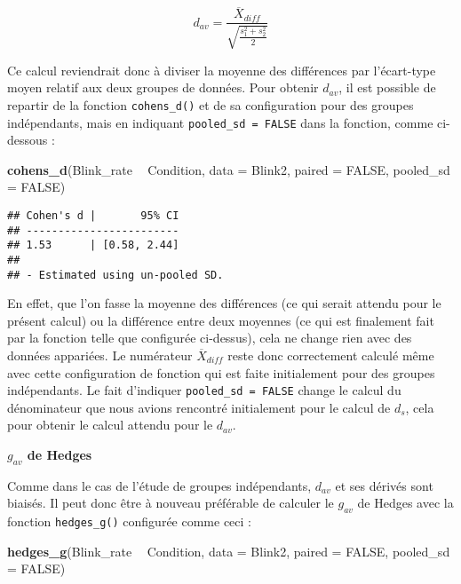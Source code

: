 \documentclass[
  french,
]{book}
\newenvironment{Shaded}{\begin{snugshade}}{\end{snugshade}}
\newcommand{\DataTypeTok}[1]{\textcolor[rgb]{0.13,0.29,0.53}{#1}}
\newcommand{\KeywordTok}[1]{\textcolor[rgb]{0.13,0.29,0.53}{\textbf{#1}}}
\newcommand{\NormalTok}[1]{#1}
\newcommand{\OperatorTok}[1]{\textcolor[rgb]{0.81,0.36,0.00}{\textbf{#1}}}
\newcommand{\OtherTok}[1]{\textcolor[rgb]{0.56,0.35,0.01}{#1}}
\newcommand{\StringTok}[1]{\textcolor[rgb]{0.31,0.60,0.02}{#1}}
\begin{document}
\[d_{av} = \frac{\overline{X} _{diff}}{\sqrt{\frac{s_{1}^2 + s_{2}^2} {2}}}\]

Ce calcul reviendrait donc à diviser la moyenne des différences par l'écart-type moyen relatif aux deux groupes de données. Pour obtenir \(d_{av}\), il est possible de repartir de la fonction \texttt{cohens\_d()} et de sa configuration pour des groupes indépendants, mais en indiquant \texttt{pooled\_sd\ =\ FALSE} dans la fonction, comme ci-dessous :

\begin{Shaded}
\begin{Highlighting}[]
\KeywordTok{cohens_d}\NormalTok{(Blink_rate }\OperatorTok{~}\StringTok{ }\NormalTok{Condition, }
         \DataTypeTok{data =}\NormalTok{ Blink2, }
         \DataTypeTok{paired =} \OtherTok{FALSE}\NormalTok{, }
         \DataTypeTok{pooled_sd =} \OtherTok{FALSE}\NormalTok{)}
\end{Highlighting}
\end{Shaded}

\begin{verbatim}
## Cohen's d |       95% CI
## ------------------------
## 1.53      | [0.58, 2.44]
## 
## - Estimated using un-pooled SD.
\end{verbatim}

En effet, que l'on fasse la moyenne des différences (ce qui serait attendu pour le présent calcul) ou la différence entre deux moyennes (ce qui est finalement fait par la fonction telle que configurée ci-dessus), cela ne change rien avec des données appariées. Le numérateur \(\overline{X} _{diff}\) reste donc correctement calculé même avec cette configuration de fonction qui est faite initialement pour des groupes indépendants. Le fait d'indiquer \texttt{pooled\_sd\ =\ FALSE} change le calcul du dénominateur que nous avions rencontré initialement pour le calcul de \(d_{s}\), cela pour obtenir le calcul attendu pour le \(d_{av}\).

\textbf{\(g_{av}\) de Hedges}

Comme dans le cas de l'étude de groupes indépendants, \(d_{av}\) et ses dérivés sont biaisés. Il peut donc être à nouveau préférable de calculer le \(g_{av}\) de Hedges avec la fonction \texttt{hedges\_g()} configurée comme ceci :

\begin{Shaded}
\begin{Highlighting}[]
\KeywordTok{hedges_g}\NormalTok{(Blink_rate }\OperatorTok{~}\StringTok{ }\NormalTok{Condition, }
         \DataTypeTok{data =}\NormalTok{ Blink2, }
         \DataTypeTok{paired =} \OtherTok{FALSE}\NormalTok{, }
         \DataTypeTok{pooled_sd =} \OtherTok{FALSE}\NormalTok{)}
\end{Highlighting}
\end{Shaded}
\end{document}
